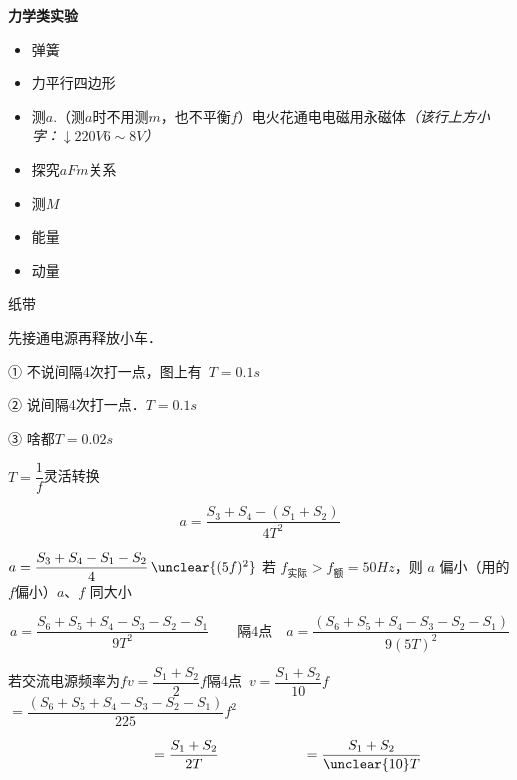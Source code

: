 \textbf{力学类实验}
\begin{itemize}
\item 弹簧
\item 力平行四边形
\item 测$a$.（测$a$时不用测$m$，也不平衡$f$）\quad 电火花通电\quad 电磁用永磁体\quad\textit{（该行上方小字：$\downarrow$\quad $220\unit{V}$\quad $6\sim8\unit{V}$）}
\item 探究$aFm$关系
\item 测$M$
\item 能量
\item 动量
\end{itemize}
\quad 纸带


先接通电源再释放小车．

① 不说间隔4次打一点，图上有\ $T=0.1\unit{s}$

② 说间隔4次打一点．$T=0.1\unit{s}$

③ 啥都\quad $T=0.02\unit{s}$

$T=\dfrac{1}{f}$\quad 灵活转换


\[
a=\frac{S_3+S_4-(S_1+S_2)}{4T^2}
\]

$a=\dfrac{S_3+S_4-S_1-S_2}{4}\,\unclear{(5f)^2}$ %
\quad 若 $f_{\text{实际}}>f_{\text{额}}=50\unit{Hz}$，则 $a$ 偏小\quad （用的$f$偏小）\quad $a$、$f$ 同大小 %

\[
a=\frac{S_6+S_5+S_4-S_3-S_2-S_1}{9T^2}\qquad\text{隔4点}\quad a=\frac{(S_6+S_5+S_4-S_3-S_2-S_1)}{9(5T)^2}
\]

若交流电源频率为$f$\quad $v=\dfrac{S_1+S_2}{2}f$\quad 隔4点\ $v=\dfrac{S_1+S_2}{10}f$\quad $=\dfrac{(S_6+S_5+S_4-S_3-S_2-S_1)}{225}f^2$

\[
\hspace{4em}=\frac{S_1+S_2}{2T}\hspace{6em}=\frac{S_1+S_2}{\text{\unclear{10}}T} %
\]

